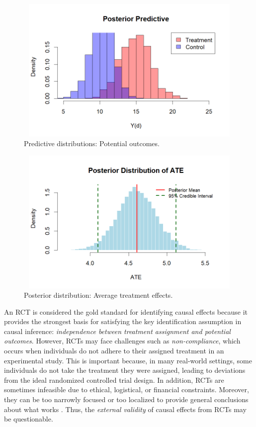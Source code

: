 \begin{figure}
	\includegraphics[width=340pt, height=200pt]{Chapters/chapter12/figures/BasicYd.png}
	\caption[List of figure caption goes here]{Predictive distributions: Potential outcomes.}\label{fig12_0}
\end{figure}


\begin{figure}
	\includegraphics[width=340pt, height=200pt]{Chapters/chapter12/figures/BasicATE.png}
	\caption[List of figure caption goes here]{Posterior distribution: Average treatment effects.}\label{fig12_0a}
\end{figure}


An RCT is considered the gold standard for identifying causal effects because it provides the strongest basis for satisfying the key identification assumption in causal inference: \textit{independence between treatment assignment and potential outcomes}. However, RCTs may face challenges such as \textit{non-compliance}, which occurs when individuals do not adhere to their assigned treatment in an experimental study. This is important because, in many real-world settings, some individuals do not take the treatment they were assigned, leading to deviations from the ideal randomized controlled trial design. In addition, RCTs are sometimes infeasible due to ethical, logistical, or financial constraints. Moreover, they can be too narrowly focused or too localized to provide general conclusions about what works \cite{deaton2010instruments}. Thus, the \textit{external validity} of causal effects from RCTs may be questionable.  

